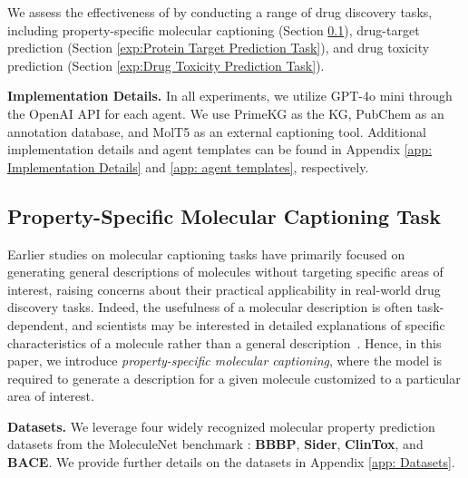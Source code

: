 We assess the effectiveness of \proposed by conducting a range of drug discovery tasks, including 
property-specific molecular captioning (Section \ref{exp:Molecular Captioning Task}),
drug-target prediction (Section \ref{exp:Protein Target Prediction Task}),
and drug toxicity prediction (Section \ref{exp:Drug Toxicity Prediction Task}).

\textbf{Implementation Details.}
In all experiments, we utilize GPT-4o mini through the OpenAI API for each agent.
We use PrimeKG \cite{chandak2023building} as the KG, PubChem \cite{kim2021pubchem} as an annotation database, and MolT5 \cite{edwards2022translation} as an external captioning tool.
Additional implementation details and agent templates can be found in Appendix \ref{app: Implementation Details} and \ref{app: agent templates}, respectively.

\subsection{Property-Specific Molecular Captioning Task
}
\label{exp:Molecular Captioning Task}
Earlier studies on molecular captioning tasks have primarily focused on generating general descriptions of molecules without targeting specific areas of interest, raising concerns about their practical applicability in real-world drug discovery tasks.
Indeed, the usefulness of a molecular description is often task-dependent, and scientists may be interested in detailed explanations of specific characteristics of a molecule rather than a general description~\cite{guo2024moltailor,edwards2024molcap}.
Hence, in this paper, we introduce \emph{property-specific molecular captioning}, where the model is required to generate a description for a given molecule customized to a particular area of interest.



\textbf{Datasets.}
We leverage four widely recognized molecular property prediction datasets from the MoleculeNet benchmark \cite{wu2018moleculenet}: \textbf{BBBP}, \textbf{Sider}, \textbf{ClinTox}, and \textbf{BACE}.
We provide further details on the datasets in Appendix \ref{app: Datasets}.

